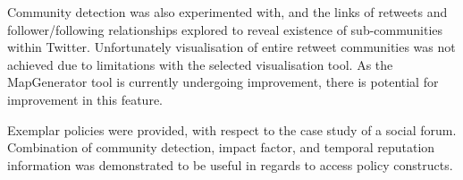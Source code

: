 Community detection was also experimented with, and the links of retweets and follower/following relationships explored to reveal existence of sub-communities within Twitter. Unfortunately visualisation of entire retweet communities was not achieved due to limitations with the selected visualisation tool. As the MapGenerator tool is currently undergoing improvement, there is potential for improvement in this feature.

Exemplar policies were provided, with respect to the case study of a social forum. Combination of community detection, impact factor, and temporal reputation information was demonstrated to be useful in regards to access policy constructs. 






